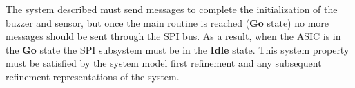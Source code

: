 The system described must send messages to complete the initialization of the buzzer and sensor, but once the main routine is reached (\textbf{Go} state) no more messages should be sent through the SPI bus. As a result, when the ASIC is in the \textbf{Go} state the SPI subsystem must be in the \textbf{Idle} state. This system property must be satisfied by the system model first refinement and any subsequent refinement representations of the system.









